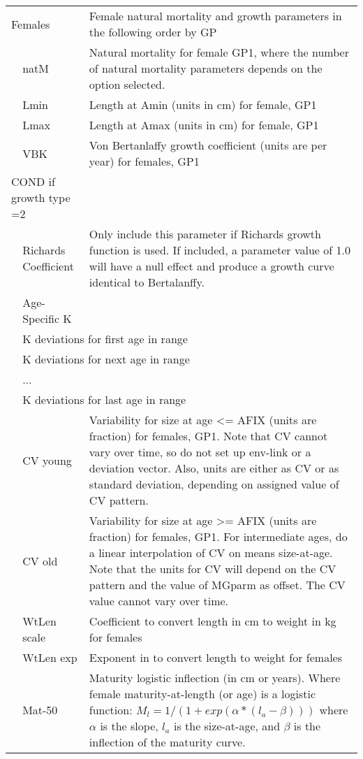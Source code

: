 \begin{center}
\begin{longtable}{p{1cm} p{2.5cm} p{10cm}}
		\multicolumn{2}{l}{Females} & Female natural mortality and growth parameters in the following order by GP\\
		& natM & Natural mortality for female GP1, where the number of natural mortality parameters depends on the option selected.\\
		& Lmin & Length at Amin (units in cm) for female, GP1 \\
		& Lmax & Length at Amax (units in cm) for female, GP1 \\
		& VBK & Von Bertanlaffy growth coefficient (units are per year) for females, GP1\\
		\hline
		\multicolumn{2}{l}{COND if growth type =2 } & \\
		& Richards Coefficient & Only include this parameter if Richards growth function is used.  If included, a parameter value of 1.0 will have a null effect and produce a growth curve identical to Bertalanffy.\\
		\pagebreak
		\multicolumn{2}{l}{COND if growth type =3 } & Age-Specific K \\
		& \multicolumn{2}{l}{K deviations for first age in range}\\
		& \multicolumn{2}{l}{K deviations for next age in range}\\
		& ... & \\
		& \multicolumn{2}{l}{K deviations for last age in range}\\
		\hline
	    & CV young & Variability for size at age <= AFIX (units are fraction) for females, GP1.  Note that CV cannot vary over time, so do not set up env-link or a deviation vector.  Also, units are either as CV or as standard deviation, depending on assigned value of CV pattern.\\
		& CV old & Variability for size at age >= AFIX (units are fraction) for females, GP1. For intermediate ages, do a linear interpolation of CV on means size-at-age.  Note that the units for CV will depend on the CV pattern and the value of MGparm as offset. The CV value cannot vary over time.\\
		\hline
		& WtLen scale & Coefficient to convert length in cm to weight in kg for females\\
		& WtLen exp & Exponent in to convert length to weight for females\\
		& Mat-50 & Maturity logistic inflection (in cm or years).  Where female maturity-at-length (or age) is a logistic function: $M_{l} = 1/(1+exp(\alpha*(l_{a} - \beta)))$ where $\alpha$ is the slope, $l_{a}$ is the size-at-age, and $\beta$ is the inflection of the maturity curve. \\ 

\end{longtable}
\end{center}
